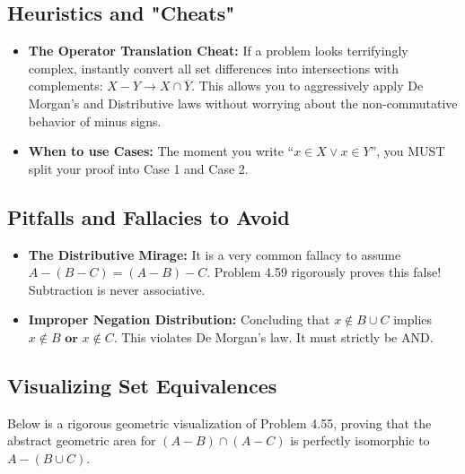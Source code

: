\documentclass[11pt]{article}
\theoremstyle{definition}
\begin{document}
\subsection{Heuristics and "Cheats"}
\begin{itemize}
    \item \textbf{The Operator Translation Cheat:} If a problem looks terrifyingly complex, instantly convert all set differences into intersections with complements: $X - Y \rightarrow X \cap \overline{Y}$. This allows you to aggressively apply De Morgan's and Distributive laws without worrying about the non-commutative behavior of minus signs.
    \item \textbf{When to use Cases:} The moment you write ``$x \in X \lor x \in Y$'', you MUST split your proof into Case 1 and Case 2.
\end{itemize}

\subsection{Pitfalls and Fallacies to Avoid}
\begin{itemize}
    \item \textbf{The Distributive Mirage:} It is a very common fallacy to assume $A - (B - C) = (A - B) - C$. Problem 4.59 rigorously proves this false! Subtraction is never associative. 
    \item \textbf{Improper Negation Distribution:} Concluding that $x \notin B \cup C$ implies $x \notin B \textbf{ or } x \notin C$. This violates De Morgan's law. It must strictly be AND.
\end{itemize}

\subsection{Visualizing Set Equivalences}
Below is a rigorous geometric visualization of Problem 4.55, proving that the abstract geometric area for $(A - B) \cap (A - C)$ is perfectly isomorphic to $A - (B \cup C)$.
\end{document}
